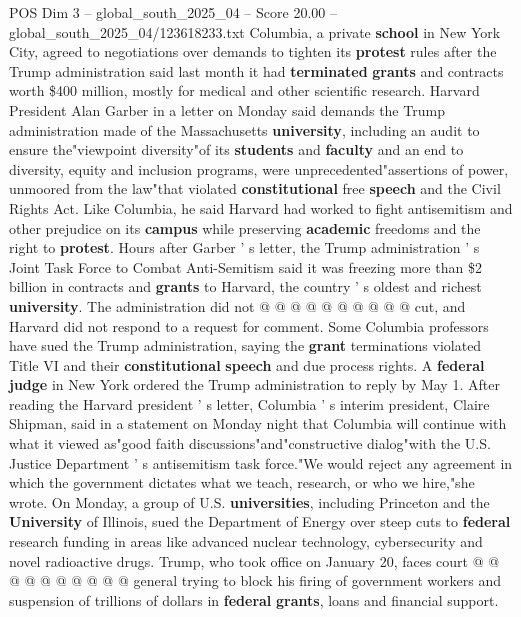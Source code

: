 \begin{textsample}{POS Dim 3 – global\_south\_2025\_04 – Score 20.00 – global\_south\_2025\_04/123618233.txt}
Columbia, a private \textbf{school} in New York City, agreed to negotiations over demands to tighten its \textbf{protest} rules after the Trump administration said last month it had \textbf{terminated} \textbf{grants} and contracts worth \$400 million, mostly for medical and other scientific research.
Harvard President Alan Garber in a letter on Monday said demands the Trump administration made of the Massachusetts \textbf{university}, including an audit to ensure the"viewpoint diversity"of its \textbf{students} and \textbf{faculty} and an end to diversity, equity and inclusion programs, were unprecedented"assertions of power, unmoored from the law"that violated \textbf{constitutional} free \textbf{speech} and the Civil Rights Act.
Like Columbia, he said Harvard had worked to fight antisemitism and other prejudice on its \textbf{campus} while preserving \textbf{academic} freedoms and the right to \textbf{protest}.
Hours after Garber ' s letter, the Trump administration ' s Joint Task Force to Combat Anti-Semitism said it was freezing more than \$2 billion in contracts and \textbf{grants} to Harvard, the country ' s oldest and richest \textbf{university}.
The administration did not @ @ @ @ @ @ @ @ @ @ cut, and Harvard did not respond to a request for comment.
Some Columbia professors have sued the Trump administration, saying the \textbf{grant} terminations violated Title VI and their \textbf{constitutional} \textbf{speech} and due process rights.
A \textbf{federal} \textbf{judge} in New York ordered the Trump administration to reply by May 1.
After reading the Harvard president ' s letter, Columbia ' s interim president, Claire Shipman, said in a statement on Monday night that Columbia will continue with what it viewed as"good faith discussions"and"constructive dialog"with the U.S.
Justice Department ' s antisemitism task force."We would reject any agreement in which the government dictates what we teach, research, or who we hire,"she wrote.
On Monday, a group of U.S. \textbf{universities}, including Princeton and the \textbf{University} of Illinois, sued the Department of Energy over steep cuts to \textbf{federal} research funding in areas like advanced nuclear technology, cybersecurity and novel radioactive drugs.
Trump, who took office on January 20, faces court @ @ @ @ @ @ @ @ @ @ general trying to block his firing of government workers and suspension of trillions of dollars in \textbf{federal} \textbf{grants}, loans and financial support.

\end{textsample}
